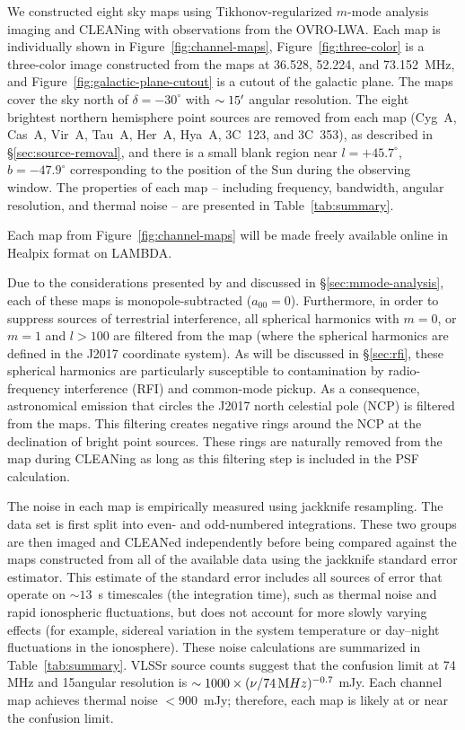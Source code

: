 \begin{bibunit}
We constructed eight sky maps using Tikhonov-regularized $m$-mode analysis imaging and CLEANing with
observations from the OVRO-LWA. Each map is individually shown in Figure~\ref{fig:channel-maps},
Figure~\ref{fig:three-color} is a three-color image constructed from the maps at 36.528,
52.224, and 73.152~MHz, and Figure~\ref{fig:galactic-plane-cutout} is a cutout of the galactic
plane. The maps cover the sky north of $\delta=-30^\circ$ with $\sim 15\arcmin$ angular resolution.
The eight brightest northern hemisphere point sources are removed from each map (Cyg~A, Cas~A,
Vir~A, Tau~A, Her~A, Hya~A, 3C~123, and 3C~353), as described in \S\ref{sec:source-removal}, and
there is a small blank region near $l=+45.7^\circ$, $b=-47.9^\circ$ corresponding to the position of
the Sun during the observing window. The properties of each map -- including frequency, bandwidth,
angular resolution, and thermal noise -- are presented in Table~\ref{tab:summary}.

Each map from Figure~\ref{fig:channel-maps} will be made freely available online in Healpix format
\citep{2005ApJ...622..759G} on LAMBDA.

Due to the considerations presented by \citet{2016ApJ...826..116V} and discussed in
\S\ref{sec:mmode-analysis}, each of these maps is monopole-subtracted ($a_{00}=0$).  Furthermore, in
order to suppress sources of terrestrial interference, all spherical harmonics with $m=0$, or $m=1$
and $l>100$ are filtered from the map (where the spherical harmonics are defined in the J2017
coordinate system). As will be discussed in \S\ref{sec:rfi}, these spherical harmonics are
particularly susceptible to contamination by radio-frequency interference (RFI) and common-mode
pickup. As a consequence, astronomical emission that circles the J2017 north celestial pole (NCP) is
filtered from the maps.  This filtering creates negative rings around the NCP at the declination of
bright point sources.  These rings are naturally removed from the map during CLEANing as long as
this filtering step is included in the PSF calculation.

The noise in each map is empirically measured using jackknife resampling. The data set is first split
into even- and odd-numbered integrations. These two groups are then imaged and CLEANed
independently before being compared against the maps constructed from all of the available data
using the jackknife standard error estimator. This estimate of the standard error includes all
sources of error that operate on $\sim13$~s timescales (the integration time), such as thermal
noise and rapid ionospheric fluctuations, but does not account for more slowly varying effects (for
example, sidereal variation in the system temperature or day--night fluctuations in the ionosphere).
These noise calculations are summarized in Table~\ref{tab:summary}.  VLSSr source counts
\citep{2014MNRAS.440..327L} suggest that the confusion limit at 74 MHz and 15\arcmin angular
resolution is $\sim 1000\times(\nu/74\,{\rm MHz})^{-0.7}$ mJy.  Each channel map achieves thermal
noise $<900$~mJy; therefore, each map is likely at or near the confusion limit.


\end{bibunit}
